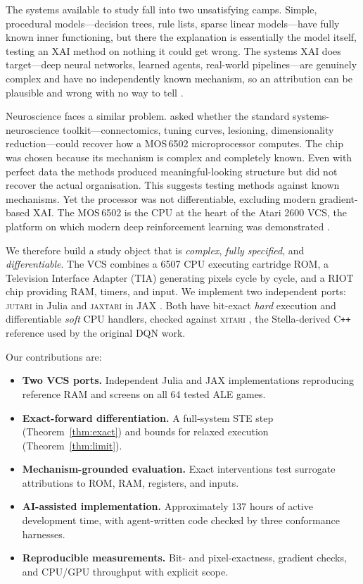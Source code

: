 \documentclass[letterpaper]{article} %
\begin{document}
The systems available to study fall into two unsatisfying camps. Simple,
procedural models---decision trees, rule lists, sparse linear models---have fully
known inner functioning, but there the explanation is essentially the model
itself, testing an XAI method on nothing it could get wrong. The systems XAI
does target---deep neural networks, learned agents, real-world pipelines---are
genuinely complex and have no independently known mechanism, so an attribution
can be plausible and wrong with no way to tell
\citep{atrey2020exploratory,nikulin2019freelunch}.

Neuroscience faces a similar problem. \citet{jonas2017could} asked whether the
standard systems-neuroscience toolkit---connectomics, tuning curves, lesioning,
dimensionality reduction---could recover how a MOS\,6502 microprocessor computes.
The chip was chosen because its mechanism is complex and completely known.
Even with perfect data the methods produced meaningful-looking structure but
did not recover the actual organisation. This suggests testing methods against
known mechanisms. Yet the processor was not differentiable, excluding modern
gradient-based XAI. The MOS\,6502 is the CPU at the heart of the Atari 2600
VCS, the platform on which modern deep reinforcement learning was demonstrated
\citep{mnih2013playing,mnih2015human,bellemare2013arcade}.

We therefore build a study object that is \emph{complex}, \emph{fully specified},
and \emph{differentiable}. The VCS combines a 6507 CPU executing cartridge ROM,
a Television Interface Adapter (TIA) generating pixels cycle by cycle, and
a RIOT chip providing RAM, timers, and input. We implement two independent
ports: \textsc{jutari} in Julia \citep{bezanson2017julia} and
\textsc{jaxtari} in JAX \citep{bradbury2018jax}. Both have bit-exact
\emph{hard} execution and differentiable \emph{soft} CPU handlers, checked
against \textsc{xitari} \citep{xitari}, the Stella-derived C\texttt{++}
reference \citep{stella} used by the original DQN work.

Our contributions are:
\begin{itemize}
  \item \textbf{Two VCS ports.} Independent Julia and JAX implementations
  reproducing reference RAM and screens on all 64 tested ALE games.
  \item \textbf{Exact-forward differentiation.} A full-system STE step
  (Theorem~\ref{thm:exact}) and bounds for relaxed execution
  (Theorem~\ref{thm:limit}).
  \item \textbf{Mechanism-grounded evaluation.} Exact interventions
  test surrogate attributions to ROM, RAM, registers, and inputs.
  \item \textbf{AI-assisted implementation.} Approximately 137 hours
  of active development time, with agent-written code checked by
  three conformance harnesses.
  \item \textbf{Reproducible measurements.} Bit- and pixel-exactness,
  gradient checks, and CPU/GPU throughput with explicit scope.
\end{itemize}
\end{document}

